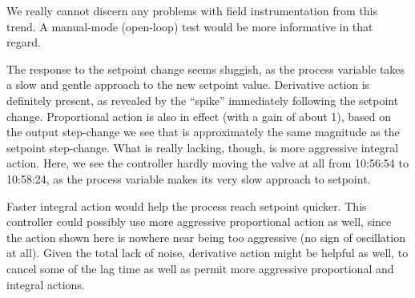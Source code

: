 \vskip 10pt

We really cannot discern any problems with field instrumentation from this trend.  A manual-mode (open-loop) test would be more informative in that regard.

\vskip 10pt

The response to the setpoint change seems sluggish, as the process variable takes a slow and gentle approach to the new setpoint value.  Derivative action is definitely present, as revealed by the ``spike'' immediately following the setpoint change.  Proportional action is also in effect (with a gain of about 1), based on the output step-change we see that is approximately the same magnitude as the setpoint step-change.  What is really lacking, though, is more aggressive integral action.  Here, we see the controller hardly moving the valve at all from 10:56:54 to 10:58:24, as the process variable makes its very slow approach to setpoint.  

\vskip 10pt

Faster integral action would help the process reach setpoint quicker.  This controller could possibly use more aggressive proportional action as well, since the action shown here is nowhere near being too aggressive (no sign of oscillation at all).  Given the total lack of noise, derivative action might be helpful as well, to cancel some of the lag time as well as permit more aggressive proportional and integral actions.












